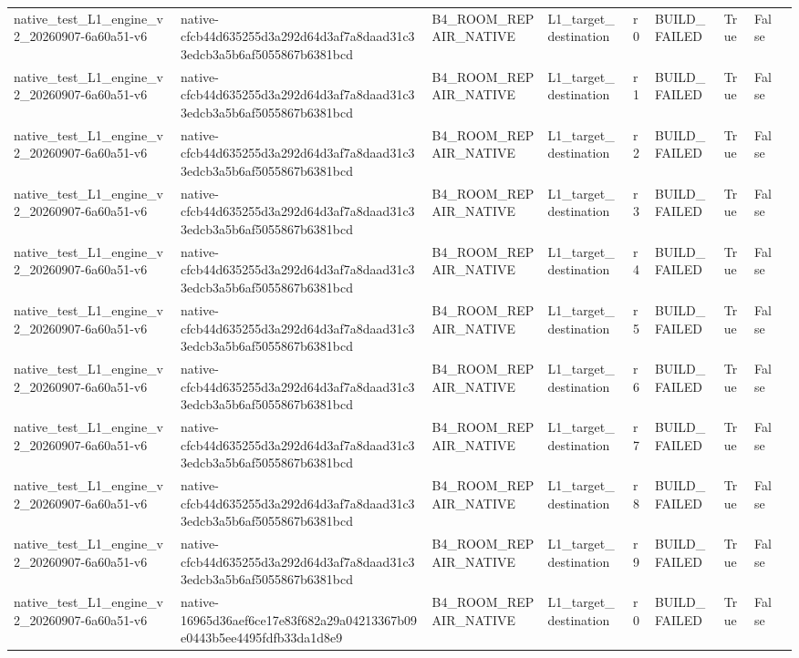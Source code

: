 \begin{tabular}{lllllllll}
native\_test\_L1\_engine\_v2\_20260907-6a60a51-v6 & native-cfcb44d635255d3a292d64d3af7a8daad31c33edcb3a5b6af5055867b6381bcd & B4\_ROOM\_REPAIR\_NATIVE & L1\_target\_destination & r0 & BUILD\_FAILED & True & False &  \\
native\_test\_L1\_engine\_v2\_20260907-6a60a51-v6 & native-cfcb44d635255d3a292d64d3af7a8daad31c33edcb3a5b6af5055867b6381bcd & B4\_ROOM\_REPAIR\_NATIVE & L1\_target\_destination & r1 & BUILD\_FAILED & True & False &  \\
native\_test\_L1\_engine\_v2\_20260907-6a60a51-v6 & native-cfcb44d635255d3a292d64d3af7a8daad31c33edcb3a5b6af5055867b6381bcd & B4\_ROOM\_REPAIR\_NATIVE & L1\_target\_destination & r2 & BUILD\_FAILED & True & False &  \\
native\_test\_L1\_engine\_v2\_20260907-6a60a51-v6 & native-cfcb44d635255d3a292d64d3af7a8daad31c33edcb3a5b6af5055867b6381bcd & B4\_ROOM\_REPAIR\_NATIVE & L1\_target\_destination & r3 & BUILD\_FAILED & True & False &  \\
native\_test\_L1\_engine\_v2\_20260907-6a60a51-v6 & native-cfcb44d635255d3a292d64d3af7a8daad31c33edcb3a5b6af5055867b6381bcd & B4\_ROOM\_REPAIR\_NATIVE & L1\_target\_destination & r4 & BUILD\_FAILED & True & False &  \\
native\_test\_L1\_engine\_v2\_20260907-6a60a51-v6 & native-cfcb44d635255d3a292d64d3af7a8daad31c33edcb3a5b6af5055867b6381bcd & B4\_ROOM\_REPAIR\_NATIVE & L1\_target\_destination & r5 & BUILD\_FAILED & True & False &  \\
native\_test\_L1\_engine\_v2\_20260907-6a60a51-v6 & native-cfcb44d635255d3a292d64d3af7a8daad31c33edcb3a5b6af5055867b6381bcd & B4\_ROOM\_REPAIR\_NATIVE & L1\_target\_destination & r6 & BUILD\_FAILED & True & False &  \\
native\_test\_L1\_engine\_v2\_20260907-6a60a51-v6 & native-cfcb44d635255d3a292d64d3af7a8daad31c33edcb3a5b6af5055867b6381bcd & B4\_ROOM\_REPAIR\_NATIVE & L1\_target\_destination & r7 & BUILD\_FAILED & True & False &  \\
native\_test\_L1\_engine\_v2\_20260907-6a60a51-v6 & native-cfcb44d635255d3a292d64d3af7a8daad31c33edcb3a5b6af5055867b6381bcd & B4\_ROOM\_REPAIR\_NATIVE & L1\_target\_destination & r8 & BUILD\_FAILED & True & False &  \\
native\_test\_L1\_engine\_v2\_20260907-6a60a51-v6 & native-cfcb44d635255d3a292d64d3af7a8daad31c33edcb3a5b6af5055867b6381bcd & B4\_ROOM\_REPAIR\_NATIVE & L1\_target\_destination & r9 & BUILD\_FAILED & True & False &  \\
native\_test\_L1\_engine\_v2\_20260907-6a60a51-v6 & native-16965d36aef6ce17e83f682a29a04213367b09e0443b5ee4495fdfb33da1d8e9 & B4\_ROOM\_REPAIR\_NATIVE & L1\_target\_destination & r0 & BUILD\_FAILED & True & False &  \\

\end{tabular}
